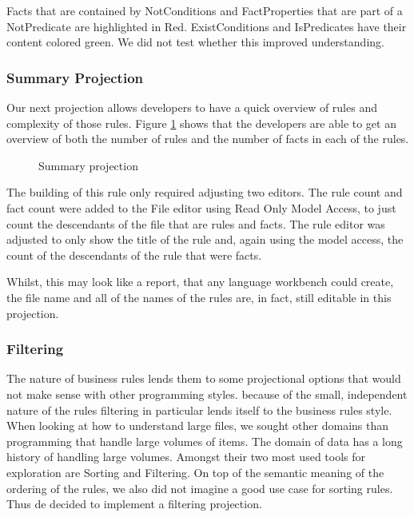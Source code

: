Facts that are contained by NotConditions and FactProperties that are part of a NotPredicate are highlighted in Red.
ExistConditions and IsPredicates have their content colored green.
We did not test whether this improved understanding.

\subsubsection{Summary Projection}
Our next projection allows developers to have a quick overview of rules and complexity of those rules.
Figure \ref{fig:summaryProjection} shows that the developers are able to get an overview of both the number of rules and the number of facts in each of the rules.

\begin{figure}[h]
    \centering
    \caption{Summary projection}
    \label{fig:summaryProjection}
\end{figure}

The building of this rule only required adjusting two editors.
The rule count and fact count were added to the File editor using Read Only Model Access, to just count the descendants of the file that are rules and facts.
The rule editor was adjusted to only show the title of the rule and, again using the model access, the count of the descendants of the rule that were facts.

Whilst, this may look like a report, that any language workbench could create, the file name and all of the names of the rules are, in fact, still editable in this projection.

\subsubsection{Filtering}
The nature of business rules lends them to some projectional options that would not make sense with other programming styles.
because of the small, independent nature of the rules filtering in particular lends itself to the business rules style.
When looking at how to understand large files, we sought other domains than programming that handle large volumes of items.
The domain of data has a long history of handling large volumes.
Amongst their two most used tools for exploration are Sorting and Filtering.
On top of the semantic meaning of the ordering of the rules, we also did not imagine a good use case for sorting rules.
Thus de decided to implement a filtering projection.

